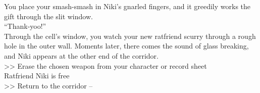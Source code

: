 You place your smash-smash in Niki’s gnarled fingers, and it greedily works the gift through the slit window.\\

“Thank-yoo!”\\

Through the cell’s window, you watch your new ratfriend scurry through a rough hole in the outer wall. Moments later, there comes the sound of glass breaking, and Niki appears at the other end of the corridor.\\

>> Erase the chosen weapon from your character or record sheet\\
 Ratfriend Niki is free\\
>> Return to the corridor -- 